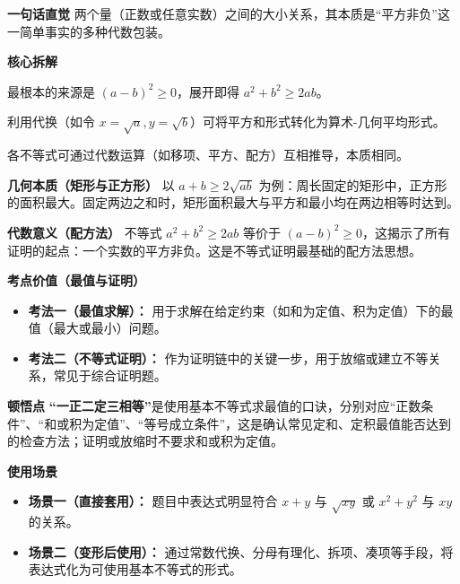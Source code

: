 \begin{explanationbox}
\textbf{\textcolor{CExplanation}{一句话直觉}}
两个量（正数或任意实数）之间的大小关系，其本质是“平方非负”这一简单事实的多种代数包装。

\medskip
\textbf{\textcolor{CExplanation}{核心拆解}}
\begin{description}[style=nextline, leftmargin=2.8em, labelsep=0.5em, itemsep=0.45em]
    \item[\textbf{要点一（平方差非负）：}] 最根本的来源是 $(a-b)^2 \ge 0$，展开即得 $a^2 + b^2 \ge 2ab$。
    \item[\textbf{要点二（均值转化）：}] 利用代换（如令 $x=\sqrt{a}, y=\sqrt{b}$）可将平方和形式转化为算术-几何平均形式。
    \item[\textbf{要点三（等价变形）：}] 各不等式可通过代数运算（如移项、平方、配方）互相推导，本质相同。
\end{description}

\medskip
\textbf{\textcolor{CExplanation}{几何本质（矩形与正方形）}}
以 $a+b \ge 2\sqrt{ab}$ 为例：周长固定的矩形中，正方形的面积最大。固定两边之和时，矩形面积最大与平方和最小均在两边相等时达到。

\medskip
\textbf{\textcolor{CExplanation}{代数意义（配方法）}}
不等式 $a^2 + b^2 \ge 2ab$ 等价于 $(a-b)^2 \ge 0$，这揭示了所有证明的起点：一个实数的平方非负。这是不等式证明最基础的配方法思想。

\medskip
\textbf{\textcolor{CExplanation}{考点价值（最值与证明）}}
\begin{itemize}[leftmargin=*, itemsep=0.5em, topsep=0.4em]
    \item \textbf{考法一（最值求解）：} 用于求解在给定约束（如和为定值、积为定值）下的最值（最大或最小）问题。
    \item \textbf{考法二（不等式证明）：} 作为证明链中的关键一步，用于放缩或建立不等关系，常见于综合证明题。
\end{itemize}

\medskip
\textbf{\textcolor{CExplanation}{顿悟点}}
\textbf{“一正二定三相等”}是使用基本不等式求最值的口诀，分别对应“正数条件”、“和或积为定值”、“等号成立条件”，这是确认常见定和、定积最值能否达到的检查方法；证明或放缩时不要求和或积为定值。

\medskip
\textbf{\textcolor{CExplanation}{使用场景}}
\begin{itemize}[leftmargin=*, itemsep=0.5em, topsep=0.4em]
    \item \textbf{场景一（直接套用）：} 题目中表达式明显符合 $x+y$ 与 $\sqrt{xy}$ 或 $x^2+y^2$ 与 $xy$ 的关系。
    \item \textbf{场景二（变形后使用）：} 通过常数代换、分母有理化、拆项、凑项等手段，将表达式化为可使用基本不等式的形式。
\end{itemize}


\end{explanationbox}
